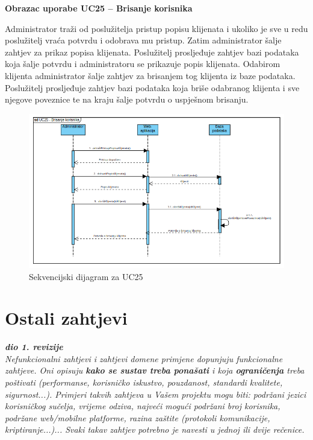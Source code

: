 				\textbf{Obrazac uporabe UC25 – Brisanje korisnika}

				Administrator traži od poslužitelja pristup popisu klijenata i ukoliko je 
				sve u redu poslužitelj vraća potvrdu i odobrava mu pristup. Zatim 
				administrator šalje zahtjev za prikaz popisa klijenata. Poslužitelj 
				prosljeđuje zahtjev bazi podataka koja šalje potvrdu i administratoru 
				se prikazuje popis klijenata. Odabirom klijenta administrator šalje zahtjev 
				za brisanjem tog klijenta iz baze podataka. Poslužitelj prosljeđuje zahtjev 
				bazi podataka koja briše odabranog klijenta i sve njegove poveznice te na 
				kraju šalje potvrdu o uspješnom brisanju.
				
				\begin{figure}[H]
					\includegraphics[scale=0.6]{dijagrami/SD25.png} 
					\centering
					\caption{Sekvencijski dijagram za UC25}
					\label{fig:sd25}
				\end{figure}		
				\eject 

	
		\section{Ostali zahtjevi}
		
			\textbf{\textit{dio 1. revizije}}\\
		 
			 \textit{Nefunkcionalni zahtjevi i zahtjevi domene primjene dopunjuju funkcionalne zahtjeve. Oni opisuju \textbf{kako se sustav treba ponašati} i koja \textbf{ograničenja} treba poštivati (performanse, korisničko iskustvo, pouzdanost, standardi kvalitete, sigurnost...). Primjeri takvih zahtjeva u Vašem projektu mogu biti: podržani jezici korisničkog sučelja, vrijeme odziva, najveći mogući podržani broj korisnika, podržane web/mobilne platforme, razina zaštite (protokoli komunikacije, kriptiranje...)... Svaki takav zahtjev potrebno je navesti u jednoj ili dvije rečenice.}
			 
			 
			 
	